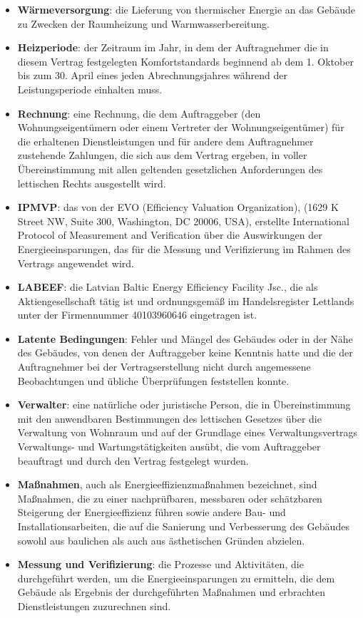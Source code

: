 \begin{multicols}{2}
\begin{itemize}[label={}]
  \item\textbf{Wärmeversorgung}: die Lieferung von thermischer Energie an das Gebäude zu Zwecken der Raumheizung und Warmwasserbereitung.
  \item\textbf{Heizperiode}: der Zeitraum im Jahr, in dem der Auftragnehmer die in diesem Vertrag festgelegten Komfortstandards beginnend ab dem 1. Oktober bis zum 30. April eines jeden Abrechnungsjahres während der Leistungsperiode einhalten muss.
  \item\textbf{Rechnung}: eine Rechnung, die dem Auftraggeber (den Wohnungseigentümern oder einem Vertreter der Wohnungseigentümer) für die erhaltenen Dienstleistungen und für andere dem Auftragnehmer zustehende Zahlungen, die sich aus dem Vertrag ergeben, in voller Übereinstimmung mit allen geltenden gesetzlichen Anforderungen des lettischen Rechts ausgestellt wird.
  \item\textbf{IPMVP}: das von der EVO (Efficiency Valuation Organization), (1629 K Street NW, Suite 300, Washington, DC 20006, USA), erstellte International Protocol of Measurement and Verification über die Auswirkungen der Energieeinsparungen, das für die Messung und Verifizierung im Rahmen des Vertrags angewendet wird.
  \item\textbf{LABEEF}: die Latvian Baltic Energy Efficiency Facility Jsc., die als Aktiengesellschaft tätig ist und ordnungsgemäß im Handelsregister Lettlands unter der Firmennummer 40103960646 eingetragen ist.
  \item\textbf{Latente Bedingungen}: Fehler und Mängel des Gebäudes oder in der Nähe des Gebäudes, von denen der Auftraggeber keine Kenntnis hatte und die der Auftragnehmer bei der Vertragserstellung nicht durch angemessene Beobachtungen und übliche Überprüfungen feststellen konnte.
  \item\textbf{Verwalter}: eine natürliche oder juristische Person, die in Übereinstimmung mit den anwendbaren Bestimmungen des lettischen Gesetzes über die Verwaltung von Wohnraum und auf der Grundlage eines Verwaltungsvertrags Verwaltungs- und Wartungstätigkeiten ausübt, die vom Auftraggeber beauftragt und durch den Vertrag festgelegt wurden.
  \item\textbf{Maßnahmen}, auch als Energieeffizienzmaßnahmen bezeichnet, sind Maßnahmen, die zu einer nachprüfbaren, messbaren oder schätzbaren Steigerung der Energieeffizienz führen sowie andere Bau- und Installationsarbeiten, die auf die Sanierung und Verbesserung des Gebäudes sowohl aus baulichen als auch aus ästhetischen Gründen abzielen.
  \item\textbf{Messung und Verifizierung}: die Prozesse und Aktivitäten, die durchgeführt werden, um die Energieeinsparungen zu ermitteln, die dem Gebäude als Ergebnis der durchgeführten Maßnahmen und erbrachten Dienstleistungen zuzurechnen sind.

\end{itemize}
\end{multicols}
